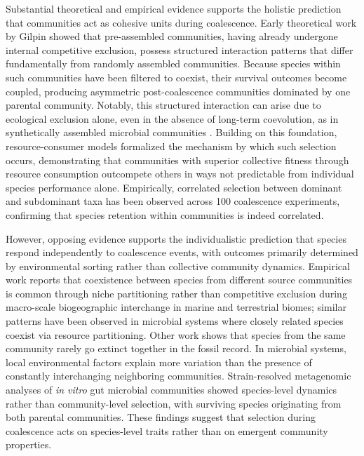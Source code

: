 Substantial theoretical and empirical evidence supports the holistic prediction that communities act as cohesive units during coalescence. Early theoretical work by Gilpin\citep{Gilpin1994} showed that pre-assembled communities, having already undergone internal competitive exclusion, possess structured interaction patterns that differ fundamentally from randomly assembled communities. Because species within such communities have been filtered to coexist, their survival outcomes become coupled, producing asymmetric post-coalescence communities dominated by one parental community\citep{Debray2022}. Notably, this structured interaction can arise due to ecological exclusion alone, even in the absence of long-term coevolution, as in synthetically assembled microbial communities \citep{Venturelli2018, Maynard2020}. Building on this foundation, resource-consumer models formalized the mechanism by which such selection occurs, demonstrating that communities with superior collective fitness through resource consumption outcompete others in ways not predictable from individual species performance alone\citep{Tikhonov2016, Lechon2021, Xie2019, Xie2021}. Empirically, correlated selection between dominant and subdominant taxa has been observed across 100 coalescence experiments, confirming that species retention within communities is indeed correlated\citep{DiazColunga2022}. 

However, opposing evidence supports the individualistic prediction that species respond independently to coalescence events, with outcomes primarily determined by environmental sorting rather than collective community dynamics. Empirical work reports that coexistence between species from different source communities is common through niche partitioning rather than competitive exclusion during macro-scale biogeographic interchange in marine and terrestrial biomes\citep{Vermeij1991}; similar patterns have been observed in microbial systems where closely related species coexist via resource partitioning\citep{Brochet2021}. Other work shows that species from the same community rarely go extinct together in the fossil record\citep{BentonEmerson2007}. In microbial systems, local environmental factors explain more variation than the presence of constantly interchanging neighboring communities\citep{VanderGucht2007}. Strain-resolved metagenomic analyses of \textit{in vitro} gut microbial communities %
showed species-level dynamics rather than community-level selection, with surviving species originating from both parental communities\citep{Goldman2025, Walton2025}. These findings suggest that selection during coalescence acts on species-level traits rather than on emergent community properties.

